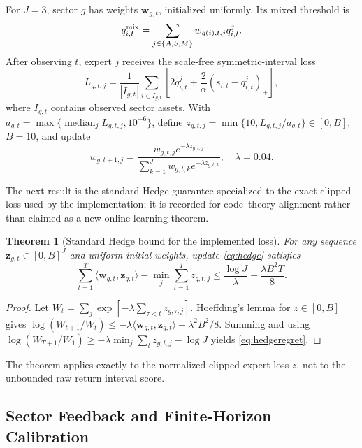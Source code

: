 \documentclass[conference]{IEEEtran}
\newtheorem{theorem}{Theorem}
\begin{document}
For $J=3$, sector $g$ has weights $\mathbf w_{g,t}$, initialized uniformly. Its mixed threshold is
\begin{equation}
 q^{\rm mix}_{i,t}=\sum_{j\in\{A,S,M\}}w_{g(i),t,j}q^j_{i,t}.
 \label{eq:mixture}
\end{equation}
After observing $t$, expert $j$ receives the scale-free symmetric-interval loss
\begin{equation}
 L_{g,t,j}=\frac{1}{|I_{g,t}|}\sum_{i\in I_{g,t}}
 \left[2q^j_{i,t}+\frac{2}{\alpha}(s_{i,t}-q^j_{i,t})_+\right],
\end{equation}
where $I_{g,t}$ contains observed sector assets. With $a_{g,t}=\max\{\operatorname{median}_jL_{g,t,j},10^{-6}\}$, define $z_{g,t,j}=\min\{10,L_{g,t,j}/a_{g,t}\}\in[0,B]$, $B=10$, and update
\begin{equation}
 w_{g,t+1,j}=\frac{w_{g,t,j}e^{-\lambda z_{g,t,j}}}
 {\sum_{k=1}^{J}w_{g,t,k}e^{-\lambda z_{g,t,k}}},\quad \lambda=0.04.
 \label{eq:hedge}
\end{equation}

The next result is the standard Hedge guarantee specialized to the exact clipped loss used by the implementation; it is recorded for code--theory alignment rather than claimed as a new online-learning theorem.
\begin{theorem}[Standard Hedge bound for the implemented loss]
For any sequence $\mathbf z_{g,t}\in[0,B]^J$ and uniform initial weights, update \eqref{eq:hedge} satisfies
\begin{equation}
 \sum_{t=1}^{T}\langle\mathbf w_{g,t},\mathbf z_{g,t}\rangle-
 \min_j\sum_{t=1}^{T}z_{g,t,j}
 \leq \frac{\log J}{\lambda}+\frac{\lambda B^2T}{8}.
 \label{eq:hedgeregret}
\end{equation}
\end{theorem}
\begin{proof}
Let $W_t=\sum_j\exp[-\lambda\sum_{\tau<t}z_{g,\tau,j}]$. Hoeffding's lemma for $z\in[0,B]$ gives $\log(W_{t+1}/W_t)\leq-\lambda\langle\mathbf w_{g,t},\mathbf z_{g,t}\rangle+\lambda^2B^2/8$. Summing and using $\log(W_{T+1}/W_1)\geq-\lambda\min_j\sum_tz_{g,t,j}-\log J$ yields \eqref{eq:hedgeregret}.
\end{proof}
The theorem applies exactly to the normalized clipped expert loss $z$, not to the unbounded raw return interval score.

\subsection{Sector Feedback and Finite-Horizon Calibration}
\end{document}
